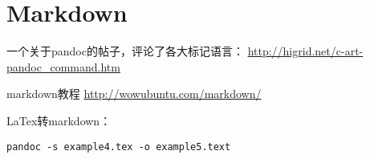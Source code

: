 \section{Markdown}

一个关于pandoc的帖子，评论了各大标记语言：
\url{http://higrid.net/c-art-pandoc_command.htm}

markdown教程
\url{http://wowubuntu.com/markdown/}



LaTex转markdown：
\begin{verbatim}
pandoc -s example4.tex -o example5.text
\end{verbatim}

